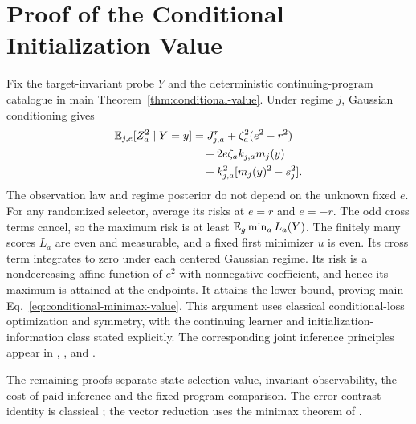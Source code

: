 \section{Proof of the Conditional Initialization Value}
Fix the target-invariant probe $Y$ and the deterministic continuing-program catalogue in main Theorem~\ref{thm:conditional-value}.
Under regime $j$, Gaussian conditioning gives
\begin{align*}
\mathbb E_{j,e}[Z_a^2\mid Y=y]&=J_{j,a}^{r}+\zeta_a^2(e^2-r^2)\\
&\quad+2e\zeta_ak_{j,a}m_j(y)\\
&\quad+k_{j,a}^2[m_j(y)^2-s_j^2].
\end{align*}
The observation law and regime posterior do not depend on the unknown fixed $e$.
For any randomized selector, average its risks at $e=r$ and $e=-r$.
The odd cross terms cancel, so the maximum risk is at least $\mathbb E_g\min_aL_a(Y)$.
The finitely many scores $L_a$ are even and measurable, and a fixed first minimizer $u$ is even.
Its cross term integrates to zero under each centered Gaussian regime.
Its risk is a nondecreasing affine function of $e^2$ with nonnegative coefficient, and hence its maximum is attained at the endpoints.
It attains the lower bound, proving main Eq.~\eqref{eq:conditional-minimax-value}.
This argument uses classical conditional-loss optimization and symmetry, with the continuing learner and initialization-information class stated explicitly.
The corresponding joint inference principles appear in , ,  and .

The remaining proofs separate state-selection value, invariant observability, the cost of paid inference and the fixed-program comparison.
The error-contrast identity is classical ; the vector reduction uses the minimax theorem of .








